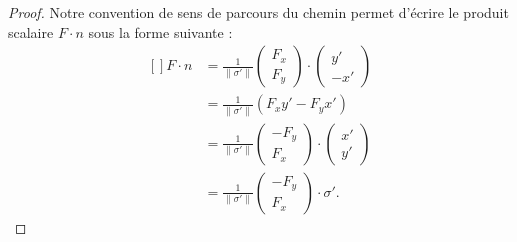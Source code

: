 \begin{proof}
    Notre convention de sens de parcours du chemin permet d'écrire le produit scalaire $F\cdot n$ sous la forme suivante :
    \begin{equation}
        \begin{aligned}[]
            F\cdot n&=\frac{1}{ \| \sigma' \| }\begin{pmatrix}
                F_x    \\ 
                F_y    
            \end{pmatrix}\cdot \begin{pmatrix}
                y'    \\ 
                -x'    
            \end{pmatrix}\\
            &=\frac{1}{ \| \sigma' \| }(F_xy'-F_yx')\\
            &=\frac{1}{ \| \sigma' \| }\begin{pmatrix}
                -F_y    \\ 
                F_x    
            \end{pmatrix}\cdot \begin{pmatrix}
                x'    \\ 
                y'    
            \end{pmatrix}\\
            &=\frac{1}{ \| \sigma' \| }\begin{pmatrix}
                -F_y    \\ 
                F_x    
            \end{pmatrix}\cdot \sigma'.
        \end{aligned}
    \end{equation}


\end{proof}
